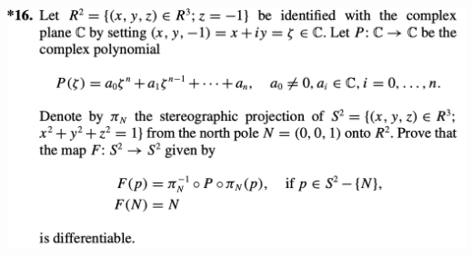 \documentclass{report}
\begin{document}
\begin{question}{}{}
\includegraphics[height=10cm,width=18cm]{HW3a1}
\end{question}
\end{document}
